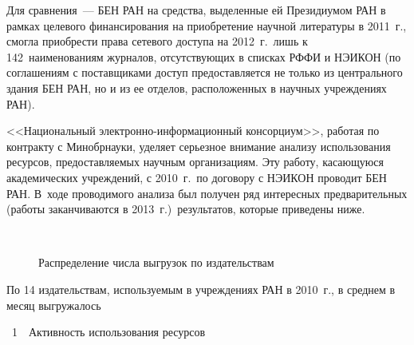 \begin{multicols}{2}
     Для сравнения~--- БЕН РАН на средства, выделенные ей Президиумом 
РАН в рамках целевого финансирования на приобретение научной 
литературы в 2011~г., смогла приобрести права сетевого доступа на 2012~г.\ 
лишь к 142~наименованиям журналов, отсутствующих в списках \mbox{РФФИ} и 
\mbox{НЭИКОН} (по соглашениям с поставщиками доступ предоставляется не 
только из центрального здания БЕН РАН, но и из ее отделов, расположенных 
в научных учреждениях РАН).
     
<<Национальный электронно-информационный консорциум>>, 
работая по контракту с Минобрнауки, уделяет серьезное 
внимание анализу использования ресурсов, предоставляемых научным 
организациям. Эту работу, касающуюся академических учреждений, с 
2010~г.\ по договору с НЭИКОН проводит БЕН РАН. В~ходе проводимого 
анализа был получен ряд интересных предварительных (работы 
заканчиваются в 2013~г.)\  результатов, которые приведены ниже.



 \begin{figure*}[b]
     \vspace*{1pt}
 \begin{center}
 \mbox{%
 \epsfxsize=99mm
 }
 \end{center}
 \vspace*{-6pt}
\begin{center}
{\small Распределение числа выгрузок по издательствам}
\end{center}
     \end{figure*}

     
     По 14 издательствам, используемым в учреждениях РАН в 2010~г., в 
среднем в месяц выгружалось\linebreak\vspace*{-12pt}

\pagebreak

\begin{center}
 \vspace*{-6pt}
{{\tablename~1}\ \ \small{Активность использования ресурсов}}

\vspace*{6pt}


\end{center}
\end{multicols}
